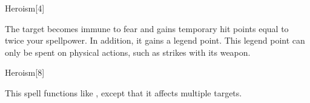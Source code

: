 \begin{spellsection}{Heroism}[4]
    \begin{spellheader}
    \end{spellheader}
    \begin{spellcontent}
        \begin{spelltargetinginfo}
        \end{spelltargetinginfo}
        \begin{spelleffects}
            \spelleffect The target becomes immune to fear and gains temporary hit points equal to twice your spellpower.
            In addition, it gains a legend point.
            This legend point can only be spent on physical actions, such as strikes with its weapon.
            \spelldur \durshort \dismissable
        \end{spelleffects}
    \end{spellcontent}
    \begin{spellfooter}
        \miscastrandom
    \end{spellfooter}
\end{spellsection}

\begin{spellsection}[Greater]{Heroism}[8]
    \begin{spellheader}
    \end{spellheader}
    \begin{spellcontent}
        \begin{spelltargetinginfo}
        \end{spelltargetinginfo}
        \begin{spelleffects}
            \spellspecial This spell functions like , except that it affects multiple targets.
        \end{spelleffects}
    \end{spellcontent}
    \begin{spellfooter}
        \miscastexplode
    \end{spellfooter}
\end{spellsection}

